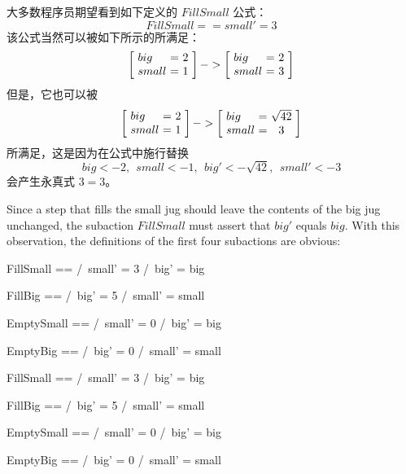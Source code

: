 \begin{ch}
  大多数程序员期望看到如下定义的 $FillSmall$ 公式：
  \[ FillSmall == small' = 3 \]
  该公式当然可以被如下所示的\tlastep{}所满足：
  \[ \dhstate{2}{1} -> \dhstate{2}{3}
  \]
  但是，它也可以被\tlastep{}
  \[ \dhstate{2}{1} -> \dhstate{\sqrt{42}}{3}
  \]
  所满足，这是因为在公式中施行替换
  \[ big <- 2, \ \ small <- 1, \ \ big' <- \sqrt{42}, \ \ small' <- 3
  \]
  会产生永真式 $3=3$。
\end{ch}
\begin{en}
Since a step that
fills the small jug should leave the contents of the big jug
unchanged, the subaction $FillSmall$ must assert that $big'$ equals
$big$.  With this observation, the definitions of the first four
subactions are obvious:
 \medskip
\begin{twocols}%
\begin{notla}
FillSmall  == /\ small' = 3 
              /\ big' = big

FillBig    == /\ big' = 5 
              /\ small' = small

EmptySmall == /\ small' = 0 
              /\ big' = big

EmptyBig   == /\ big' = 0 
              /\ small' = small
\end{notla}
\begin{tlatex}
%
%
\@pvspace{8.0pt}%
%
%
\@pvspace{8.0pt}%
%
%
\@pvspace{8.0pt}%
%
%
\end{tlatex}
\midcol
\begin{verbatim*}
FillSmall  == /\ small' = 3 
              /\ big' = big

FillBig    == /\ big' = 5 
              /\ small' = small

EmptySmall == /\ small' = 0 
              /\ big' = big

EmptyBig   == /\ big' = 0 
              /\ small' = small
\end{verbatim*} 
\end{twocols} 
\medskip
\end{en}
